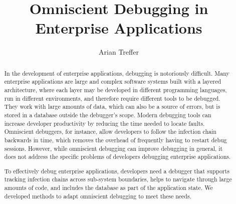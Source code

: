 \documentclass[
			en,
			phd,
			draft,
			garamond,
			12pt,
			]{sty/swathesis}
\author{Arian Treffer}
\title{Omniscient Debugging in Enterprise Applications}
\begin{document}
\frontmatter
\begin{otherlanguage}{german}
\maketitle
\end{otherlanguage}

\linenumbers

\begin{abstract}


In the development of enterprise applications, debugging is notoriously difficult.
Many enterprise applications are large and complex software systems built with a layered architecture, where each layer may be developed in different programming languages, run in different environments, and therefore require different tools to be debugged.
They work with large amounts of data, which can also be a source of errors, but is stored in a database outside the debugger's scope.
%
%
Modern debugging tools can increase developer productivity by reducing the time needed to locate faults.
Omniscient debuggers, for instance, allow developers to follow the infection chain backwards in time, which removes the overhead of frequently having to restart debug sessions.
However, while omniscient debugging can improve debugging in general,
it does not address the specific problems of developers debugging enterprise applications.


To effectively debug enterprise applications, developers need a debugger that supports tracking infection chains across sub-system boundaries, helps to navigate through large amounts of code, and includes the database as part of the application state.
We developed methods to adapt omniscient debugging to meet these needs.


\end{abstract}
\end{document}
